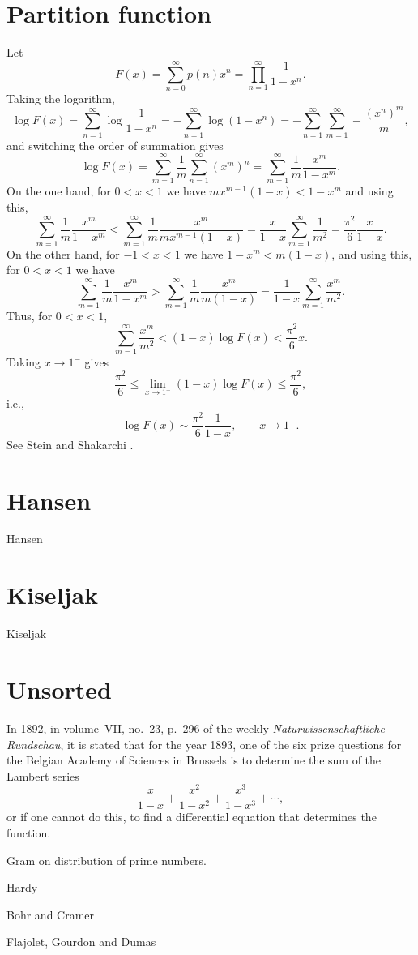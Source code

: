 \documentclass{amsart}
\begin{document}
\section{Partition function}
Let 
\[
F(x)=\sum_{n=0}^\infty p(n) x^n = \prod_{n=1}^\infty \frac{1}{1-x^n}.
\]
Taking the logarithm,
\[
\log F(x)=\sum_{n=1}^\infty \log \frac{1}{1-x^n}
=-\sum_{n=1}^\infty \log(1-x^n)
=-\sum_{n=1}^\infty \sum_{m=1}^\infty -\frac{(x^n)^m}{m},
\]
and switching the order of summation gives
\[
\log F(x)
=\sum_{m=1}^\infty \frac{1}{m} \sum_{n=1}^\infty (x^m)^n
=\sum_{m=1}^\infty \frac{1}{m} \frac{x^m}{1-x^m}.
\]
On the one hand, for $0<x<1$ we have $mx^{m-1}(1-x)<1-x^m$ and using this,
\[
\sum_{m=1}^\infty \frac{1}{m} \frac{x^m}{1-x^m}<\sum_{m=1}^\infty \frac{1}{m} \frac{x^m}{mx^{m-1}(1-x)}
=\frac{x}{1-x} \sum_{m=1}^\infty \frac{1}{m^2}=\frac{\pi^2}{6} \frac{x}{1-x}.
\]
On the other hand, for $-1<x<1$ we have $1-x^m<m(1-x)$, and using this, for $0<x<1$ we have
\[
\sum_{m=1}^\infty \frac{1}{m} \frac{x^m}{1-x^m}
>\sum_{m=1}^\infty \frac{1}{m} \frac{x^m}{m(1-x)}
=\frac{1}{1-x} \sum_{m=1}^\infty \frac{x^m}{m^2}.
\]
Thus, for $0<x<1$,
\[
\sum_{m=1}^\infty \frac{x^m}{m^2} < (1-x) \log F(x) < \frac{\pi^2}{6}x.
\]
Taking $x \to 1^{-}$ gives
\[
\frac{\pi^2}{6} \leq \lim_{x \to 1^-} (1-x)\log F(x) \leq \frac{\pi^2}{6},
\]
i.e.,
\[
\log F(x) \sim \frac{\pi^2}{6} \frac{1}{1-x}, \qquad x \to 1^-.
\]
See Stein and Shakarchi \cite[p.~311]{steinII}.



\section{Hansen}
Hansen \cite{hansen}


\section{Kiseljak}
Kiseljak \cite{kiseljak}



\section{Unsorted}
In 1892, in volume~VII, no.~23, 
p.~296 of the weekly {\em Naturwissenschaftliche Rundschau}, it is stated that for the year 1893, one of the six prize questions
for the 
Belgian Academy of Sciences in Brussels
 is
to determine the sum of the Lambert series
\[
\frac{x}{1-x}+\frac{x^2}{1-x^2}+\frac{x^3}{1-x^3}+\cdots,
\]
or if one cannot do this, to find a differential equation that determines the function.

Gram \cite{gram} on distribution of prime numbers.

Hardy \cite{divergent}

Bohr and Cramer \cite[p.~820]{bohr}

Flajolet, Gourdon and Dumas \cite{flajolet}




\end{document}
